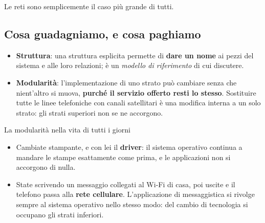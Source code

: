 Le reti sono semplicemente il caso più grande di tutti.

\subsection{Cosa guadagniamo, e cosa paghiamo}

\begin{itemize}
    \item \textbf{Struttura}: una struttura esplicita permette di \textbf{dare un nome} ai pezzi del
          sistema e alle loro relazioni; è un \emph{modello di riferimento} di cui discutere.
    \item \textbf{Modularità}: l'implementazione di uno strato può cambiare senza che nient'altro si
          muova, \textbf{purché il servizio offerto resti lo stesso}. Sostituire tutte le linee
          telefoniche con canali satellitari è una modifica interna a un solo strato: gli strati
          superiori non se ne accorgono.
\end{itemize}

\begin{esempio}{La modularità nella vita di tutti i giorni}
\begin{itemize}
    \item Cambiate stampante, e con lei il \textbf{driver}: il sistema operativo continua a mandare le stampe
          esattamente come prima, e le applicazioni non si accorgono di nulla.
    \item State scrivendo un messaggio collegati al Wi-Fi di casa, poi uscite e il telefono passa alla
          \textbf{rete cellulare}. L'applicazione di messaggistica si rivolge sempre al sistema operativo nello
          stesso modo: del cambio di tecnologia si occupano gli strati inferiori.
\end{itemize}
\end{esempio}


